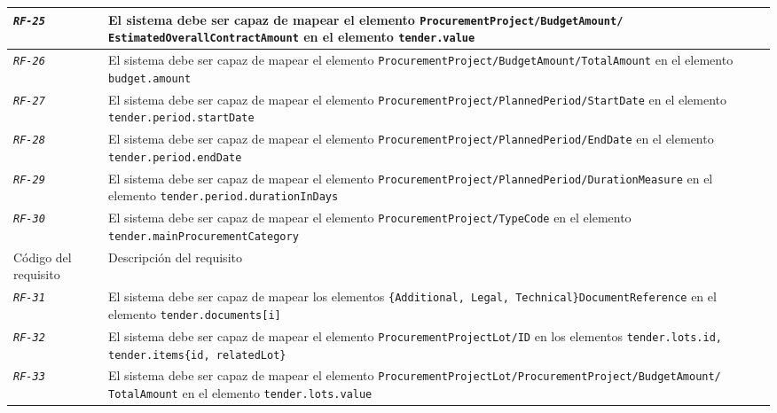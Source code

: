 \begin{longtable}{|| M{3cm} | M{12cm} ||}
                \hline
                    \texttt{\textit{RF-25}} & El sistema debe ser capaz de mapear el elemento \texttt{ProcurementProject/BudgetAmount/
                    EstimatedOverallContractAmount} en el elemento \texttt{tender.value} \\
                \hline
                    \texttt{\textit{RF-26}} & El sistema debe ser capaz de mapear el elemento \texttt{ProcurementProject/BudgetAmount/TotalAmount} en el elemento \texttt{budget.amount} \\
                \hline
                    \texttt{\textit{RF-27}} & El sistema debe ser capaz de mapear el elemento \texttt{ProcurementProject/PlannedPeriod/StartDate} en el elemento \texttt{tender.period.startDate} \\
                \hline
                    \texttt{\textit{RF-28}} & El sistema debe ser capaz de mapear el elemento \texttt{ProcurementProject/PlannedPeriod/EndDate} en el elemento \texttt{tender.period.endDate} \\
                \hline
                    \texttt{\textit{RF-29}} & El sistema debe ser capaz de mapear el elemento \texttt{ProcurementProject/PlannedPeriod/DurationMeasure} en el elemento \texttt{tender.period.durationInDays} \\
                \hline
                    \texttt{\textit{RF-30}} & El sistema debe ser capaz de mapear el elemento \texttt{ProcurementProject/TypeCode} en el elemento \texttt{tender.mainProcurementCategory} \\
                \hline
\newpage
                \hline
                    Código del requisito & Descripción del requisito \\
                \hline
                \hline
                    \texttt{\textit{RF-31}} & El sistema debe ser capaz de mapear los elementos \texttt{\{Additional, Legal, Technical\}DocumentReference} en el elemento \texttt{tender.documents[i]} \\
                \hline
                    \texttt{\textit{RF-32}} & El sistema debe ser capaz de mapear el elemento \texttt{ProcurementProjectLot/ID} en los elementos \texttt{tender.lots.id, tender.items\{id, relatedLot\}} \\
                \hline
                    \texttt{\textit{RF-33}} & El sistema debe ser capaz de mapear el elemento \texttt{ProcurementProjectLot/ProcurementProject/BudgetAmount/
                    TotalAmount} en el elemento \texttt{tender.lots.value} \\

\end{longtable}
